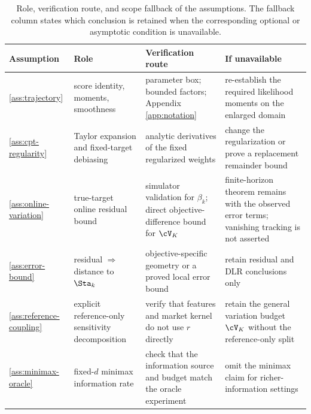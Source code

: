 \begin{table}[t]
\centering
\caption{Role, verification route, and scope fallback of the assumptions.  The fallback column states which conclusion is retained when the corresponding optional or asymptotic condition is unavailable.}
\label{tab:assumption-roles}
\small
\begin{tabularx}{\textwidth}{@{}p{}p{}p{}X@{}}
\toprule
Assumption & Role & Verification route & If unavailable \\
\midrule
\ref{ass:trajectory} & score identity, moments, smoothness & parameter box; bounded factors; Appendix \ref{app:notation} & re-establish the required likelihood moments on the enlarged domain \\
\ref{ass:cpt-regularity} & Taylor expansion and fixed-target debiasing & analytic derivatives of the fixed regularized weights & change the regularization or prove a replacement remainder bound \\
\ref{ass:online-variation} & true-target online residual bound & simulator validation for $\beta_k$; direct objective-difference bound for $\cV_K$ & finite-horizon theorem remains with the observed error terms; vanishing tracking is not asserted \\
\ref{ass:error-bound} & residual $\Rightarrow$ distance to $\Sta_k$ & objective-specific geometry or a proved local error bound & retain residual and DLR conclusions only \\
\ref{ass:reference-coupling} & explicit reference-only sensitivity decomposition & verify that features and market kernel do not use $r$ directly & retain the general variation budget $\cV_K$ without the reference-only split \\
\ref{ass:minimax-oracle} & fixed-$d$ minimax information rate & check that the information source and budget match the oracle experiment & omit the minimax claim for richer-information settings \\
\bottomrule
\end{tabularx}
\end{table}
